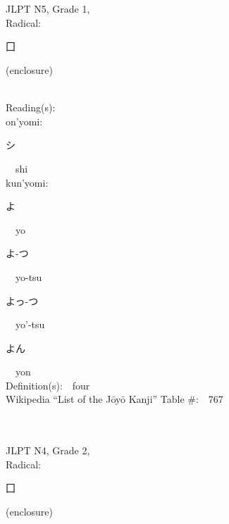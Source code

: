 \begin{multicols}{2}
\ \ \\
{\fontsize{34pt}{40pt}  }\ \ \\  %
{JLPT N5, Grade 1, \\Radical:\ \ {\begin{CJK}{UTF8}{min} 囗 \end{CJK}} (enclosure) } \\
Reading(s):\ \ \\
{\hspace*{1em}}on'yomi:\ \ \\
{\hspace*{2em}}{\begin{CJK}{UTF8}{min} シ \end{CJK}}\ \ shi\ \ \\
{\hspace*{1em}}kun'yomi:\ \ \\
{\hspace*{2em}}{\begin{CJK}{UTF8}{min} よ \end{CJK}}\ \ yo\ \ \\
{\hspace*{2em}}{\begin{CJK}{UTF8}{min} よ-つ \end{CJK}}\ \ yo-tsu\ \ \\
{\hspace*{2em}}{\begin{CJK}{UTF8}{min} よっ-つ \end{CJK}}\ \ yo'-tsu\ \ \\
{\hspace*{2em}}{\begin{CJK}{UTF8}{min} よん \end{CJK}}\ \ yon\ \ \\
Definition(s):\ \ four \\
Wikipedia ``List of the J\=oy\=o Kanji'' Table \#:\ \ 767 \\
\ \ \\
{\fontsize{34pt}{40pt}  }\ \ \\  %
{JLPT N4, Grade 2, \\Radical:\ \ {\begin{CJK}{UTF8}{min} 囗 \end{CJK}} (enclosure) } \\

\end{multicols}
